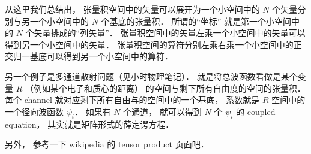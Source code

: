 从这里我们总结出， 张量积空间中的矢量可以展开为一个小空间中的 $N$ 个矢量分别与另一个小空间中的 $N$ 个基底的张量积． 所谓的“坐标” 就是第一个小空间中的 $N$ 个矢量排成的“列矢量”． 张量积空间中的矢量左乘一个小空间中的矢量可以得到另一个小空间中的矢量． 张量积空间的算符分别左乘右乘一个小空间中的正交归一基底可以得到另一个小空间中的算符．

另一个例子是多通道散射问题（见小时物理笔记）． 就是将总波函数看做是某个变量 $R$ （例如某个电子和质心的距离） 的空间与剩下所有自由度的空间的张量积． 每个 channel 就对应剩下所有自由与的空间中的一个基底， 系数就是 $R$ 空间中的一个径向波函数 $\psi_i$． 如果有 $N$ 个通道， 就可以得到 $N$ 个 $\psi_i$ 的 coupled equation， 其实就是矩阵形式的薛定谔方程．

另外， 参考一下 wikipedia 的 tensor product 页面吧．
